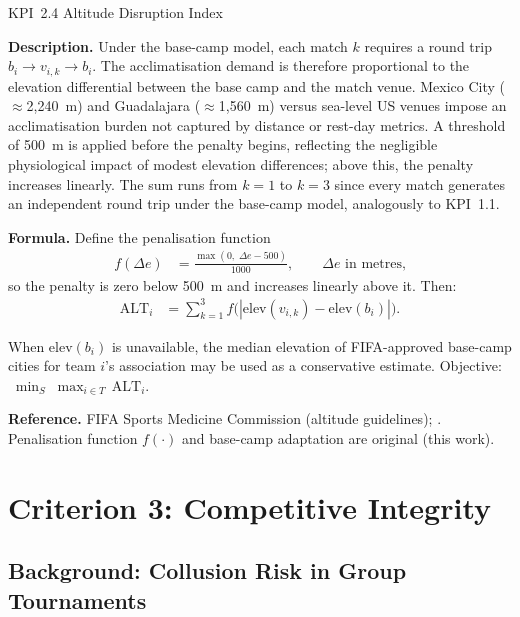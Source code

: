 \documentclass[12pt, letterpaper]{article}
\newcommand{\kpilabel}[1]{\noindent\textbf{#1}\enspace}
\begin{document}
\begin{kpibox}{KPI~2.4 \textendash{} Altitude Disruption Index}

\kpilabel{Description.}
Under the base-camp model, each match $k$ requires a round trip
$b_i \!\to\! v_{i,k} \!\to\! b_i$.  The acclimatisation demand is
therefore proportional to the elevation differential between the base
camp and the match venue.  Mexico City ($\approx$2{,}240~m) and
Guadalajara ($\approx$1{,}560~m) versus sea-level US venues impose
an acclimatisation burden not captured by distance or rest-day metrics.
A threshold of 500~m is applied before the penalty begins, reflecting
the negligible physiological impact of modest elevation differences;
above this, the penalty increases linearly.  The sum runs from $k=1$
to $k=3$ since every match generates an independent round trip under
the base-camp model, analogously to KPI~1.1.

\medskip
\kpilabel{Formula.}
Define the penalisation function
\begin{align*}
  f(\Delta e) &= \frac{\max(0,\;\Delta e - 500)}{1000},
  \qquad \Delta e \text{ in metres,}
\end{align*}
so the penalty is zero below 500~m and increases linearly above it.
Then:
\begin{align*}
  \mathrm{ALT}_i &= \sum_{k=1}^{3}
    f\!\bigl(|\mathrm{elev}(v_{i,k}) - \mathrm{elev}(b_i)|\bigr).
\end{align*}
\vspace{-8pt}

\noindent
When $\mathrm{elev}(b_i)$ is unavailable, the median elevation of
FIFA-approved base-camp cities for team $i$'s association may be used
as a conservative estimate.
Objective: $\;\displaystyle\min_{S}\;\max_{i \in T}\,\mathrm{ALT}_i$.

\medskip
\kpilabel{Reference.}
FIFA Sports Medicine Commission (altitude guidelines);
\citet{MullanEtAl2025}.
Penalisation function $f(\cdot)$ and base-camp adaptation are original
(this work).
\end{kpibox}

\section{Criterion 3: Competitive Integrity}

\subsection{Background: Collusion Risk in Group Tournaments}
\label{sec:collusion}
\end{document}
